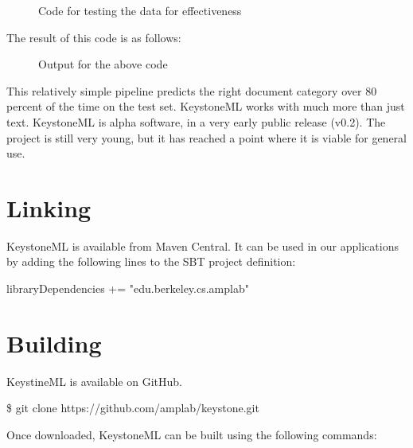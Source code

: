 \documentclass[9pt,twocolumn,twoside]{styles/osajnl}
\begin{document}
\begin{figure}[htbp]
\centering
{}
\caption{Code for testing the data for effectiveness}
\label{fig:Code for testing the data for effectiveness}
\end{figure}


The result of this code is as follows:

\begin{figure}[htbp]
\centering
{}
\caption{Output for the above code}
\label{fig:Output for the above code}
\end{figure}

This relatively simple pipeline predicts the right document category
over 80 percent of the time on the test set. KeystoneML works with
much more than just text. KeystoneML is alpha software, in a very
early public release (v0.2). The project is still very young, but it
has reached a point where it is viable for general use.

\section{Linking}

KeystoneML is available from Maven Central. It can be used in our
applications by adding the following lines to the SBT project
definition:

libraryDependencies += "edu.berkeley.cs.amplab" %



\section{Building}

KeystineML is available on GitHub.

\$ git clone https://github.com/amplab/keystone.git

Once downloaded, KeystoneML can be built using the following commands:
\end{document}
